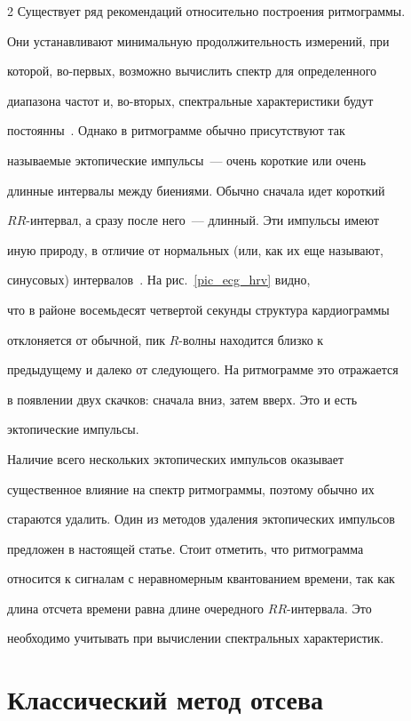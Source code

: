 \begin{multicols}{2}
Существует ряд рекомендаций относительно построения ритмограммы.


Они устанавливают минимальную продолжительность измерений, при


которой, во-первых, возможно вычислить спектр для определенного


диапазона частот и, во-вторых, спектральные характеристики будут


постоянны~\cite{1ma}. Однако в ритмограмме обычно присутствуют так


называемые эктопические импульсы~--- очень короткие или очень


длинные интервалы между биениями. Обычно сначала идет короткий


$RR$-интервал, а сразу после него~--- длинный. Эти импульсы имеют


иную природу, в отличие от нормальных (или, как их еще называют,


синусовых) интервалов~\cite{1ma, 3ma}. На рис.~\ref{pic_ecg_hrv} видно,


что в районе восемьдесят четвертой секунды структура кардиограммы


отклоняется от обычной, пик $R$-волны находится близко к


предыду\-ще\-му и далеко от следующего. На ритмограмме это отражается


в появлении двух скачков: сначала вниз, затем вверх. Это и есть


эктопические им\-пульсы.





Наличие всего нескольких эктопических импульсов оказывает


существенное влияние на спектр ритмограммы, поэтому обычно их


стараются удалить. Один из методов удаления эктопических импульсов


предложен в настоящей статье. Стоит отметить, что ритмограмма


относится к сигналам с неравномерным квантованием времени, так как


длина отсчета времени равна длине очередного $RR$-интервала. Это


необходимо учитывать при вычислении спектральных характеристик.





\section{Классический метод отсева}






\end{multicols}

